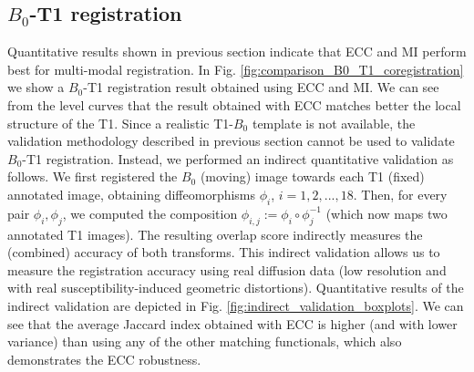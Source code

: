 \subsection{$B_{0}$-T1 registration}
Quantitative results shown in previous section indicate that ECC and MI perform best for multi-modal registration. In Fig. \ref{fig:comparison_B0_T1_coregistration} we show a $B_{0}$-T1 registration result obtained using ECC and MI. We can see from the level curves that the result obtained with ECC matches better the local structure of the T1. Since a realistic T1-$B_{0}$ template is not available, the validation methodology described in previous section cannot be used to validate $B_{0}$-T1 registration. Instead, we performed an indirect quantitative validation as follows. We first registered the $B_{0}$ (moving) image towards each T1 (fixed) annotated image, obtaining diffeomorphisms $\phi_{i}$, $i=1,2,...,18$. Then, for every pair $\phi_{i}, \phi_{j}$, we computed the composition $\phi_{i,j}:=\phi_{i}\circ \phi_{j}^{-1}$ (which now maps two annotated T1 images). The resulting overlap score indirectly measures the (combined) accuracy of both transforms. This indirect validation allows us to measure the registration accuracy using real diffusion data (low resolution and with real susceptibility-induced geometric distortions). Quantitative results of the indirect validation are depicted in Fig. \ref{fig:indirect_validation_boxplots}. We can see that the average Jaccard index obtained with ECC is higher (and with lower variance) than using any of the other matching functionals, which also demonstrates the ECC robustness.


